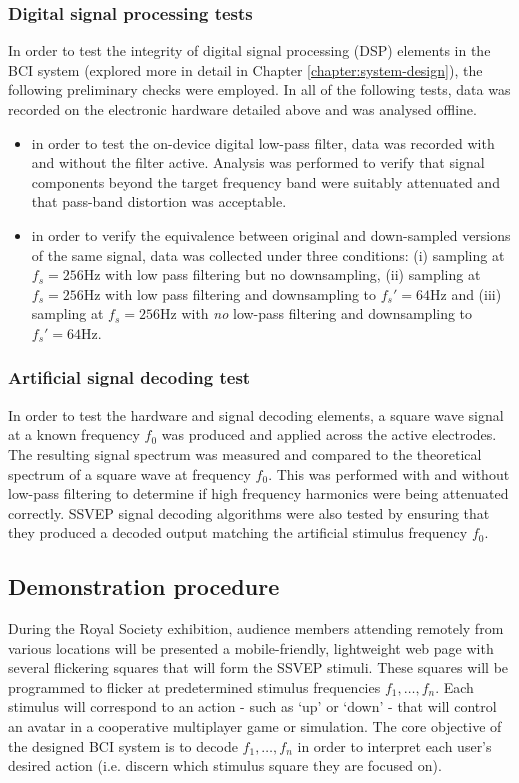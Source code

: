 \subsubsection{Digital signal processing tests}
In order to test the integrity of digital signal processing (DSP) elements in the BCI system (explored more in detail in Chapter \ref{chapter:system-design}), the following preliminary checks were employed. In all of the following tests, data was recorded on the electronic hardware detailed above and was analysed offline.
\begin{itemize}
    \item in order to test the on-device digital low-pass filter, data was recorded with and without the filter active. Analysis was performed to verify that signal components beyond the target frequency band were suitably attenuated and that pass-band distortion was acceptable. 
    \item in order to verify the equivalence between original and down-sampled versions of the same signal, data was collected under three conditions: (i) sampling at $f_s=256$Hz with low pass filtering but no downsampling, (ii) sampling at $f_s=256$Hz with low pass filtering and downsampling to $f_s'=64$Hz and (iii) sampling at $f_s=256$Hz with \textit{no} low-pass filtering and downsampling to $f_s'=64$Hz.
\end{itemize}

\subsubsection{Artificial signal decoding test}
In order to test the hardware and signal decoding elements, a square wave signal at a known frequency $f_0$ was produced and applied across the active electrodes. The resulting signal spectrum was measured and compared to the theoretical spectrum of a square wave at frequency $f_0$. This was performed with and without low-pass filtering to determine if high frequency harmonics were being attenuated correctly. SSVEP signal decoding algorithms were also tested by ensuring that they produced a decoded output matching the artificial stimulus frequency $f_0$.

\subsection{Demonstration procedure}
During the Royal Society exhibition, audience members attending remotely from various locations will be presented a mobile-friendly, lightweight web page with several flickering squares that will form the SSVEP stimuli. These squares will be programmed to flicker at predetermined stimulus frequencies $f_1, \dots, f_n$. Each stimulus will correspond to an action - such as `up' or `down' - that will control an avatar in a cooperative multiplayer game or simulation. The core objective of the designed BCI system is to decode $f_1, \dots, f_n$ in order to interpret each user's desired action (i.e. discern which stimulus square they are focused on).